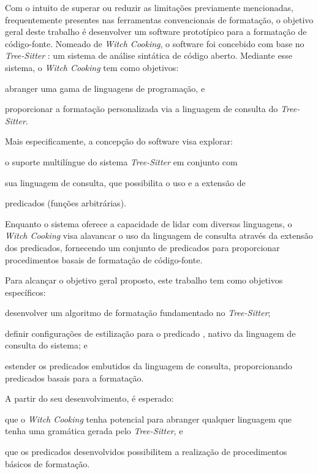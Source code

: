 \documentclass
  [11pt,a4paper,english,brazil,openright,sumario=tradicional,twoside]
  {abntex2}
\newcommand{\treesitter}{\textit{Tree-Sitter}\xspace}
\newcommand{\witchcooking}{\textit{Witch Cooking}\xspace}
\begin{document}
  Com o intuito de superar ou reduzir as limitações previamente mencionadas,
  frequentemente presentes nas ferramentas convencionais de formatação, o
  objetivo geral deste trabalho é desenvolver um software prototípico para a
  formatação de código-fonte. Nomeado de \witchcooking \cite{silva-2023-witch},
  o software foi concebido com base no \treesitter
  \cite{tree-sitter-2023-tree}: um sistema de análise sintática de código
  aberto. Mediante esse sistema, o \witchcooking tem como objetivos:
  \begin{inparaenum}
    \item abranger uma gama de linguagens de programação, e
    \item proporcionar a formatação personalizada via a linguagem de consulta
          do \treesitter.
  \end{inparaenum}

  Mais especificamente, a concepção do software visa explorar:
  \begin{inparaenum}
    \item o suporte multilíngue do sistema \treesitter em conjunto com
    \item sua linguagem de consulta, que possibilita o uso e a extensão de
    \item predicados (funções arbitrárias).
  \end{inparaenum}
  Enquanto o sistema oferece a capacidade de lidar com diversas linguagens,
  o \witchcooking visa alavancar o uso da linguagem de consulta através da
  extensão dos predicados, fornecendo um conjunto de predicados para
  proporcionar procedimentos basais de formatação de código-fonte.

  Para alcançar o objetivo geral proposto, este trabalho tem como objetivos
  específicos:
  \begin{inparaenum}
    \item desenvolver um algoritmo de formatação fundamentado no \treesitter;
    \item definir configurações de estilização para o predicado
          , nativo da linguagem de consulta do sistema;
          e
    \item estender os predicados embutidos da linguagem de consulta,
          proporcionando predicados basais para a formatação.
  \end{inparaenum}

  A partir do seu desenvolvimento, é esperado:
  \begin{inparaenum}
    \item que o \witchcooking tenha potencial para abranger qualquer linguagem
          que tenha uma gramática gerada pelo \treesitter, e
    \item que os predicados desenvolvidos possibilitem a realização de
          procedimentos básicos de formatação.
  \end{inparaenum}
\end{document}

